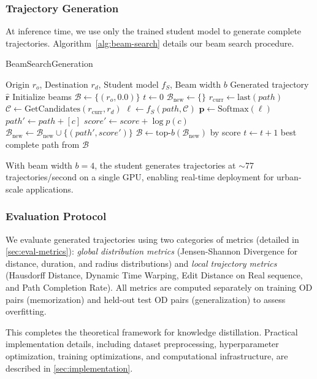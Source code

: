 \subsubsection{Trajectory Generation}
At inference time, we use only the trained student model to generate complete trajectories. Algorithm~\ref{alg:beam-search} details our beam search procedure.

\begin{algorithm}[t]
\caption{BeamSearchGeneration}
\label{alg:beam-search}
\begin{algorithmic}
\Require Origin $r_o$, Destination $r_d$, Student model $f_S$, Beam width $b$
\Ensure Generated trajectory $\hat{\mathbf{r}}$
\State Initialize beams $\mathcal{B} \gets \{(r_o, 0.0)\}$ 
\State $t \gets 0$
    \State $\mathcal{B}_{\text{new}} \gets \{\}$
        \State $r_{\text{curr}} \gets \text{last}(path)$
        \State $\mathcal{C} \gets \text{GetCandidates}(r_{\text{curr}}, r_d)$ 
        \State $\mathbf{\ell} \gets f_S(path, \mathcal{C})$ 
        \State $\mathbf{p} \gets \text{Softmax}(\mathbf{\ell})$
            \State $path' \gets path + [c]$
            \State $score' \gets score + \log p(c)$
            \State $\mathcal{B}_{\text{new}} \gets \mathcal{B}_{\text{new}} \cup \{(path', score')\}$
        \EndFor
    \EndFor
    \State $\mathcal{B} \gets \text{top-}b(\mathcal{B}_{\text{new}})$ by score
    \State $t \gets t + 1$
\EndWhile
\State \Return best complete path from $\mathcal{B}$
\end{algorithmic}
\end{algorithm}

\begin{remark}
With beam width $b=4$, the student generates trajectories at $\sim$77 trajectories/second on a single GPU, enabling real-time deployment for urban-scale applications.
\end{remark}

\subsubsection{Evaluation Protocol}
\label{sec:method-eval-metrics}
We evaluate generated trajectories using two categories of metrics (detailed in \autoref{sec:eval-metrics}): \emph{global distribution metrics} (Jensen-Shannon Divergence for distance, duration, and radius distributions) and \emph{local trajectory metrics} (Hausdorff Distance, Dynamic Time Warping, Edit Distance on Real sequence, and Path Completion Rate). All metrics are computed separately on training OD pairs (memorization) and held-out test OD pairs (generalization) to assess overfitting.

\bigskip

This completes the theoretical framework for knowledge distillation. Practical implementation details, including dataset preprocessing, hyperparameter optimization, training optimizations, and computational infrastructure, are described in \autoref{sec:implementation}.